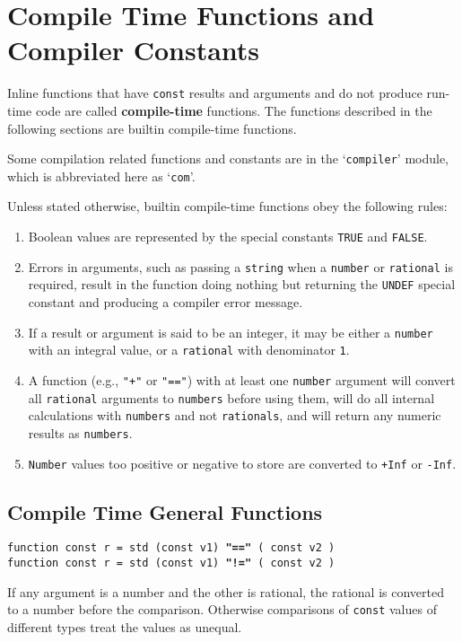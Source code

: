 \documentclass[12pt]{article}
\newcommand{\key}[1]{{\rm \bfseries #1}}
\newcommand{\ttkey}[1]{{\tt \bfseries #1}}
\newenvironment{indpar}[1][0.3in]%
	{\begin{list}{}%
		     {\setlength{\itemsep}{0in}%
		      \setlength{\topsep}{0in}%
		      \setlength{\parsep}{1ex}%
		      \setlength{\labelwidth}{#1}%
		      \setlength{\leftmargin}{#1}%
		      \addtolength{\leftmargin}{\labelsep}}%
	 \item}%
	{\end{list}}
\begin{document}
\section{Compile Time Functions and Compiler Constants}

Inline functions that have {\tt const} results and arguments
and do not produce run-time code are called \key{compile-time}
functions.  The functions described in the
following sections are builtin compile-time functions.

Some compilation related functions and
constants are in the `{\tt compiler}' module,
which is abbreviated here as `{\tt com}'.

Unless stated otherwise, builtin compile-time functions
obey the following rules:
\begin{enumerate}
\item
Boolean values are represented by the special constants
{\tt TRUE} and {\tt FALSE}.
\item
Errors in arguments, such as passing a {\tt string} when a
{\tt number} or {\tt rational} is required, result in the
function doing nothing but returning
the {\tt UNDEF} special constant and producing
a compiler error message.
\item
If a result or argument is said to be an integer, it may
be either a {\tt number} with an integral value, or a
{\tt rational} with denominator {\tt 1}.
\item
A function (e.g., {\tt "+"} or {\tt "=="})
with at least one {\tt number} argument will
convert all {\tt rational} arguments to {\tt numbers}
before using them, will do all internal calculations with
{\tt numbers} and not {\tt rationals},
and will return any numeric results as {\tt numbers}.
\item
{\tt Number} values too positive or negative to store
are converted to {\tt +Inf} or {\tt -Inf}.
\end{enumerate}

\subsection{Compile Time General Functions}

{\tt function const r = std (const v1) \ttkey{"=="} ( const v2 )} \\
{\tt function const r = std (const v1) \ttkey{"!="} ( const v2 )}
\begin{indpar}
If any argument is a number and the other is rational,
the rational is converted to a number before the comparison.
Otherwise comparisons of {\tt const} values of different types treat
the values as unequal.
\end{indpar}
\end{document}
